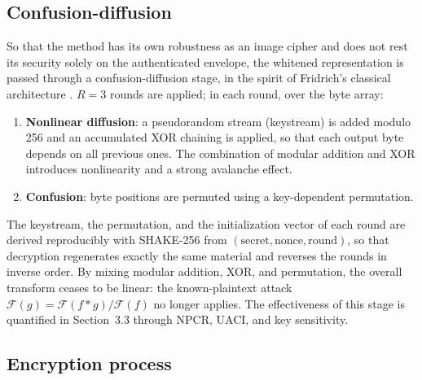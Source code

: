 \documentclass{llncs}
\begin{document}
\subsection{Confusion-diffusion}

So that the method has its own robustness as an image cipher and does not
rest its security solely on the authenticated envelope, the whitened
representation is passed through a confusion-diffusion stage, in the spirit
of Fridrich's classical architecture \cite{fridrich}. $R=3$ rounds are
applied; in each round, over the byte array:

\begin{enumerate}
  \item \textbf{Nonlinear diffusion}: a pseudorandom stream (keystream) is
    added modulo 256 and an accumulated XOR chaining is applied, so that
    each output byte depends on all previous ones. The combination of modular
    addition and XOR introduces nonlinearity and a strong avalanche effect.
  \item \textbf{Confusion}: byte positions are permuted using a key-dependent
    permutation.
\end{enumerate}

The keystream, the permutation, and the initialization vector of each round
are derived reproducibly with SHAKE-256 from $(\text{secret},
\text{nonce}, \text{round})$, so that decryption regenerates exactly the
same material and reverses the rounds in inverse order. By mixing modular
addition, XOR, and permutation, the overall transform ceases to be linear:
the known-plaintext attack $\mathcal{F}(g)=\mathcal{F}(f*g)/\mathcal{F}(f)$
no longer applies. The effectiveness of this stage is quantified in
Section~3.3 through NPCR, UACI, and key sensitivity.

\subsection{Encryption process}
\end{document}
